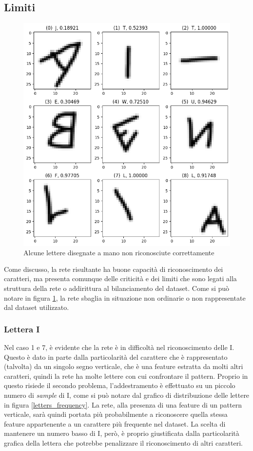 \documentclass[a4paper,12pt]{article}
\begin{document}
\subsection{Limiti}

\begin{figure}
\centering
\includegraphics[width=.6\linewidth]{images/drawn_letters_wrong_prediction.png}
\caption{Alcune lettere disegnate a mano non riconosciute correttamente}
\label{letters_wrong_prediction}
\end{figure}

Come discusso, la rete risultante ha buone capacità di riconoscimento dei caratteri, ma presenta comunque delle criticità e dei limiti che sono legati alla struttura della rete o addirittura al bilanciamento del dataset.
Come si può notare in figura \ref{letters_wrong_prediction}, la rete sbaglia in situazione non ordinarie o non rappresentate dal dataset utilizzato.

\subsubsection{Lettera I}
Nel caso 1 e 7, è evidente che la rete è in difficoltà nel riconoscimento delle I. Questo è dato in parte dalla particolarità del carattere che è rappresentato (talvolta) da un singolo segno verticale, che è una feature estratta da molti altri caratteri, quindi la rete ha molte lettere con cui confrontare il pattern. Proprio in questo risiede il secondo problema, l'addestramento è effettuato su un piccolo numero di \textit{sample} di I, come si può notare dal grafico di distribuzione delle lettere in figura \ref{letters_frequency}.
La rete, alla presenza di una feature di un pattern verticale, sarà quindi portata più probabilmente a riconoscere quella stessa feature appartenente a un carattere più frequente nel dataset. La scelta di mantenere un numero basso di I, però, è proprio giustificata dalla particolarità grafica della lettera che potrebbe penalizzare il riconoscimento di altri caratteri.
\end{document}
